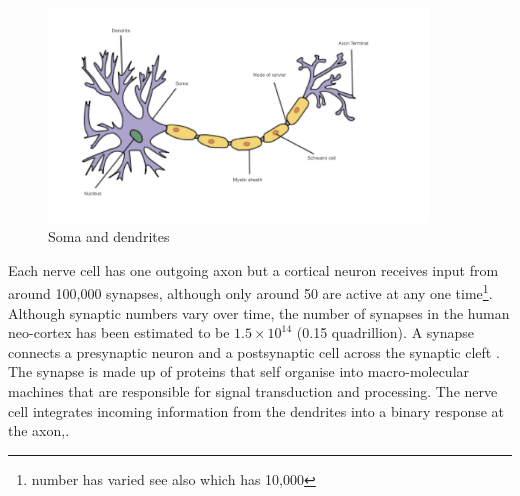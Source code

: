 

\begin{figure}
    \centering
    \includegraphics[width=0.9\textwidth]{images/nerve_cell001.jpeg}
    \caption{Soma and dendrites}
    \label{fig:soma and dendrites}
\end{figure}

Each nerve cell has one outgoing axon but a cortical neuron receives input from around 100,000 synapses, although only around 50 are active at any one time\cite{lisman2017glutamatergic}\footnote{number has varied see also \cite{laughlin2003communication} which has 10,000}. 
Although synaptic numbers vary over time, the number of synapses in the human neo-cortex has been estimated to be $1.5 \times 10^{14}$ (0.15 quadrillion)\cite{pakkenberg2003aging}. A synapse connects a presynaptic neuron and a postsynaptic cell across the synaptic cleft \cite{sudhof2012presynaptic}. The synapse is made up of proteins that self organise into macro-molecular machines that are responsible for signal transduction and processing\cite{frank2016nmda}.  The nerve cell integrates incoming information from the dendrites into a binary response at the axon\cite{lassek2015synaptic},\cite{pocklington2006proteomes}.

